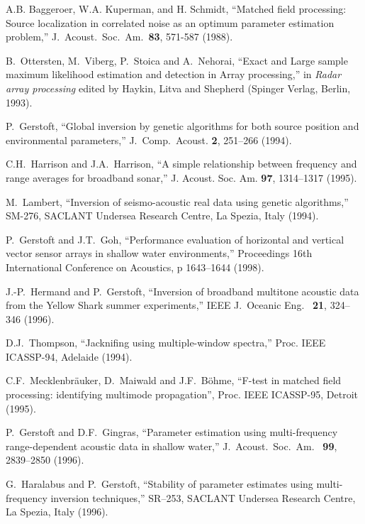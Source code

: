 \documentclass{saclantc}
\begin{document}
\begin{thebibliography}{11}
  A.B. Baggeroer, W.A. Kuperman, and H.
Schmidt, ``Matched field processing: Source localization in
correlated noise as an optimum parameter estimation problem,''
J.\ Acoust.\ Soc.\ Am.\ {\bf 83}, 571-587 (1988).

B.\ Ottersten, M.\ Viberg, P.\ Stoica and A.\ Nehorai, ``Exact and
Large sample maximum likelihood estimation and detection in Array
processing,'' in {\it Radar array processing} 
edited by Haykin, Litva and Shepherd  (Spinger Verlag, Berlin, 1993).


P.~Gerstoft,  ``Global inversion by genetic algorithms for both source
position and environmental parameters,'' {J.\ Comp.\ Acoust.} 
  {\bf 2}, 251--266 (1994).

C.H.\ Harrison and J.A.\ Harrison, ``A simple relationship between
frequency and range averages for broadband sonar,'' 
{J. Acoust. Soc. Am.} {\bf 97}, 1314--1317 (1995).

 M.\ Lambert, 
``Inversion of seismo-acoustic real data using genetic algorithms,'' 
SM-276, SACLANT Undersea Research Centre, La Spezia, Italy (1994).

 P.\ Gerstoft and J.T.\ Goh, ``Performance evaluation of horizontal and vertical
vector sensor arrays in shallow water environments,'' Proceedings 16th International Conference on Acoustics,  p 1643--1644 (1998).

 J.-P.~Hermand and P.~Gerstoft, ``Inversion of broadband multitone
acoustic data from the Yellow Shark summer experiments,''
{IEEE J.\ Oceanic Eng.\ } {\bf 21}, 324--346 (1996).

D.J.\ Thompson, ``Jacknifing using multiple-window spectra,''
Proc. IEEE ICASSP-94, Adelaide (1994).

C.F.\ Mecklenbr\"auker, D.\ Maiwald and  J.F.\ B\"ohme,
    ``F-test in matched field processing: 
       identifying multimode propagation'', Proc. IEEE ICASSP-95,
       Detroit (1995).

P.~Gerstoft and D.F.~Gingras, ``Parameter estimation using
 multi-frequency range-dependent acoustic data in shallow water,'' {
 J.~Acoust.~Soc.~Am.\ } {\bf 99}, 2839--2850 (1996).

 G.~Haralabus and P.~Gerstoft, ``Stability of
parameter estimates using multi-frequency inversion techniques,'' 
{SR--253, SACLANT Undersea Research Centre, La Spezia, Italy} (1996).


\end{thebibliography}
\end{document}
